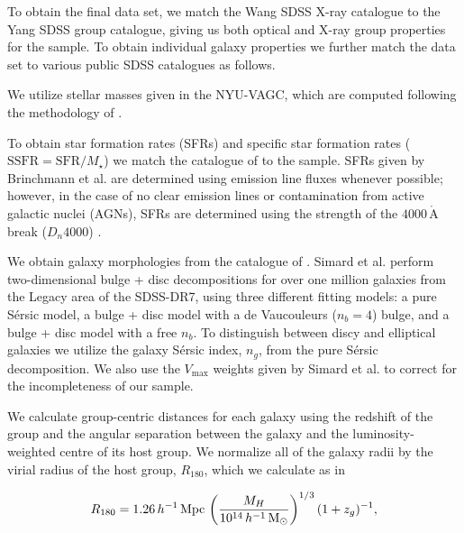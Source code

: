 To obtain the final data set, we match the Wang SDSS X-ray catalogue
to the Yang SDSS group catalogue, giving us both optical and X-ray
group properties for the sample.  To obtain individual galaxy
properties we further match the data set to various public SDSS
catalogues as follows.
\par
We utilize stellar masses given in the NYU-VAGC, which are computed
following the methodology of \citet{blanton2007}.
\par
To obtain star formation rates (SFRs) and specific star formation
rates ($\mathrm{SSFR} = \mathrm{SFR} / M_\star$) we match the
catalogue of \citet{brinchmann2004} to the sample.  SFRs given by
Brinchmann et al. are determined using emission line fluxes whenever
possible; however, in the case of no clear emission lines or
contamination from active galactic nuclei (AGNs), SFRs are determined
using the strength of the $4000\,\mathrm{\mathring{A}}$ break
($D_n4000$) \citep{brinchmann2004}.
\par
We obtain galaxy morphologies from the catalogue of
\citet{simard2011}.  Simard et al. perform two-dimensional bulge +
disc decompositions for over one million galaxies from the Legacy area
of the SDSS-DR7, using three different fitting models: a pure
S{\'e}rsic model, a bulge + disc model with a de Vaucouleurs ($n_b =
4$) bulge, and a bulge + disc model with a free $n_b$.  To distinguish
between discy and elliptical galaxies we utilize the galaxy S{\'e}rsic
index, $n_g$, from the pure S{\'e}rsic decomposition.  We also use the
$V_\mathrm{max}$ weights given by Simard et al. to correct for the
incompleteness of our sample.
\par
We calculate group-centric distances for each galaxy using the
redshift of the group and the angular separation between the galaxy
and the luminosity-weighted centre of its host group.  We normalize
all of the galaxy radii by the virial radius of the host group,
$R_{180}$, which we calculate as in \citet{yang2007}

\begin{equation}
  R_{180} =
  1.26\,h^{-1}\,\mathrm{Mpc}\,\left(\frac{M_H}{10^{14}\,h^{-1}\,\mathrm{M_{\odot}}}
  \right )^{1/3} (1 + z_g)^{-1},
\end{equation}


